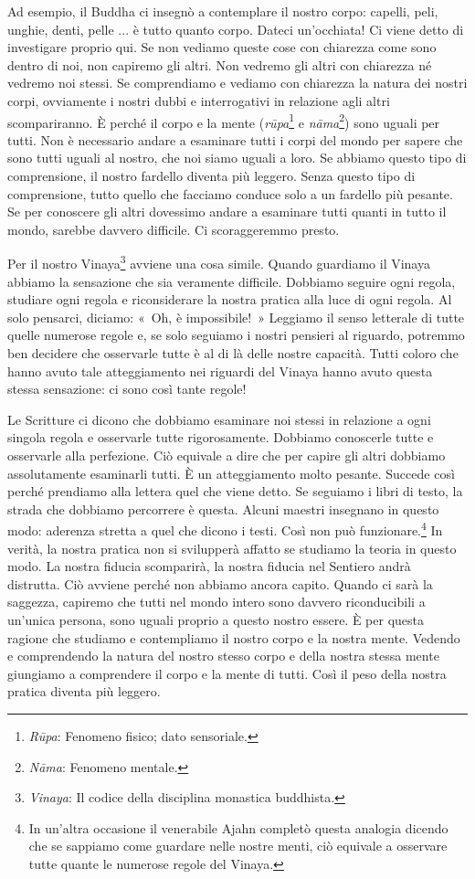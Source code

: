 Ad esempio, il Buddha ci insegnò a contemplare il nostro corpo: capelli,
peli, unghie, denti, pelle ... è tutto quanto corpo. Dateci
un'occhiata! Ci viene detto di investigare proprio qui. Se non vediamo
queste cose con chiarezza come sono dentro di noi, non capiremo gli
altri. Non vedremo gli altri con chiarezza né vedremo noi stessi. Se
comprendiamo e vediamo con chiarezza la natura dei nostri corpi,
ovviamente i nostri dubbi e interrogativi in relazione agli altri
scompariranno. È perché il corpo e la mente (\emph{rūpa}\footnote{\emph{Rūpa}:
  Fenomeno fisico; dato sensoriale.} e \emph{nāma}\footnote{\emph{Nāma}:
  Fenomeno mentale.}) sono uguali per tutti. Non è necessario andare a
esaminare tutti i corpi del mondo per sapere che sono tutti uguali al
nostro, che noi siamo uguali a loro. Se abbiamo questo tipo di
comprensione, il nostro fardello diventa più leggero. Senza questo tipo
di comprensione, tutto quello che facciamo conduce solo a un fardello
più pesante. Se per conoscere gli altri dovessimo andare a esaminare
tutti quanti in tutto il mondo, sarebbe davvero difficile. Ci
scoraggeremmo presto.

Per il nostro Vinaya\footnote{\emph{Vinaya}: Il codice della disciplina
  monastica buddhista.} avviene una cosa simile. Quando guardiamo il
Vinaya abbiamo la sensazione che sia veramente difficile. Dobbiamo
seguire ogni regola, studiare ogni regola e riconsiderare la nostra
pratica alla luce di ogni regola. Al solo pensarci, diciamo: «~Oh, è
impossibile!~» Leggiamo il senso letterale di tutte quelle numerose
regole e, se solo seguiamo i nostri pensieri al riguardo, potremmo ben
decidere che osservarle tutte è al di là delle nostre capacità. Tutti
coloro che hanno avuto tale atteggiamento nei riguardi del Vinaya hanno
avuto questa stessa sensazione: ci sono così tante regole!

Le Scritture ci dicono che dobbiamo esaminare noi stessi in relazione a
ogni singola regola e osservarle tutte rigorosamente. Dobbiamo
conoscerle tutte e osservarle alla perfezione. Ciò equivale a dire che
per capire gli altri dobbiamo assolutamente esaminarli tutti. È un
atteggiamento molto pesante. Succede così perché prendiamo alla lettera
quel che viene detto. Se seguiamo i libri di testo, la strada che
dobbiamo percorrere è questa. Alcuni maestri insegnano in questo modo:
aderenza stretta a quel che dicono i testi. Così non può
funzionare.\footnote{In un'altra occasione il venerabile Ajahn completò
  questa analogia dicendo che se sappiamo come guardare nelle nostre
  menti, ciò equivale a osservare tutte quante le numerose regole del
  Vinaya.} In verità, la nostra pratica non si svilupperà affatto se
studiamo la teoria in questo modo. La nostra fiducia scomparirà, la
nostra fiducia nel Sentiero andrà distrutta. Ciò avviene perché non
abbiamo ancora capito. Quando ci sarà la saggezza, capiremo che tutti
nel mondo intero sono davvero riconducibili a un'unica persona, sono
uguali proprio a questo nostro essere. È per questa ragione che studiamo
e contempliamo il nostro corpo e la nostra mente. Vedendo e comprendendo
la natura del nostro stesso corpo e della nostra stessa mente giungiamo
a comprendere il corpo e la mente di tutti. Così il peso della nostra
pratica diventa più leggero.

